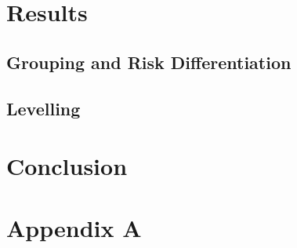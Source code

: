 \documentclass[11pt]{article}
\begin{document}
\section{Results}
\label{sec:org86e4e49}
\subsection{Grouping and Risk Differentiation}
\label{sec:org07cc061}
\subsection{Levelling}
\label{sec:org798c682}





\section{Conclusion}
\label{sec:org692c048}
\section{Appendix A}
\label{sec:org495fb83}
\end{document}
